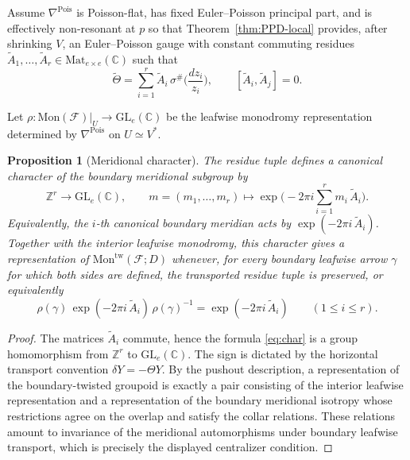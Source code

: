 \documentclass[11pt]{amsart}
\theoremstyle{plain}
\newtheorem{proposition}[theorem]{Proposition}
\theoremstyle{definition}
\newcommand{\Mon}{\mathrm{Mon}}
\newcommand{\fol}{\mathcal{F}}
\newcommand{\ZZ}{\mathbb Z}
\newcommand{\CC}{\mathbb C}
\newcommand{\GL}{\mathrm{GL}}
\theoremstyle{definition}
\begin{document}
Assume $\nabla^{\mathrm{Pois}}$ is Poisson-flat, has fixed Euler--Poisson principal part, and is effectively non-resonant at $p$ so that Theorem~\ref{thm:PPD-local} provides,
after shrinking $V$, an Euler--Poisson gauge with constant commuting residues
$\widetilde A_1,\dots,\widetilde A_r\in\mathrm{Mat}_{e\times e}(\CC)$ such that
\begin{equation}\label{eq:PPD-again}
\widetilde\Theta
=\sum_{i=1}^r \widetilde A_i\,\sigma^\# \Big(\frac{dz_i}{z_i}\Big),
\qquad
[\widetilde A_i,\widetilde A_j]=0.
\end{equation}

Let $\rho:\Mon(\fol)|_{U}\to \GL_e(\CC)$ be the leafwise monodromy representation determined by $\nabla^{\mathrm{Pois}}$
on $U\simeq V^*$.

\begin{proposition}[Meridional character]\label{prop:meridional-character}
The residue tuple defines a canonical character of the boundary meridional subgroup by
\begin{equation}\label{eq:char}
\ZZ^r\longrightarrow \GL_e(\CC),
\qquad
m=(m_1,\dots,m_r)\longmapsto
\exp\Big(-2\pi i\sum_{i=1}^r m_i\,\widetilde A_i\Big).
\end{equation}
Equivalently, the $i$-th canonical boundary meridian acts by $\exp(-2\pi i\,\widetilde A_i)$. Together with the interior leafwise monodromy, this character gives a representation of $\Mon^{\mathrm{tw}}(\fol;D)$ whenever, for every boundary leafwise arrow $\gamma$ for which both sides are defined, the transported residue tuple is preserved, or equivalently
\[
\rho(\gamma)\,\exp(-2\pi i\,\widetilde A_i)\,\rho(\gamma)^{-1}=\exp(-2\pi i\,\widetilde A_i)
\qquad(1\le i\le r).
\]
\end{proposition}

\begin{proof}
The matrices $\widetilde A_i$ commute, hence the formula \eqref{eq:char} is a group homomorphism from $\ZZ^r$ to $\GL_e(\CC)$. The sign is dictated by the horizontal transport convention $\delta Y=-\Theta Y$. By the pushout description, a representation of the boundary-twisted groupoid is exactly a pair consisting of the interior leafwise representation and a representation of the boundary meridional isotropy whose restrictions agree on the overlap and satisfy the collar relations. These relations amount to invariance of the meridional automorphisms under boundary leafwise transport, which is precisely the displayed centralizer condition.
\end{proof}
\end{document}
